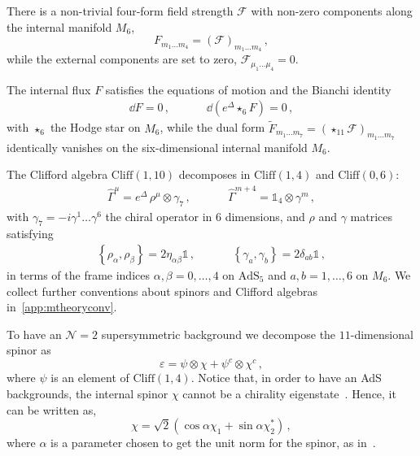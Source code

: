 \documentclass[debug]{phd}
\begin{document}
There is a non-trivial four-form field strength $\mathcal{F}$ with non-zero components along the internal manifold $M_6$, 
%
	\begin{equation}
		F_{m_1 \ldots m_4} = \left(\mathcal{F}\right)_{m_1 \ldots m_4}\, ,
	\end{equation}
%
while the external components are set to zero, $\mathcal{F}_{\mu_1 \ldots \mu_4} = 0$.

The internal flux $F$ satisfies the equations of motion and the Bianchi identity
%
	\begin{equation}
		\begin{array}{ccccc}
			\dd  F = 0\, , & & & & \dd  (e^\Delta \star_6 F) = 0\, , 
		\end{array}
	\end{equation}
%
with $\star_6$ the Hodge star on $M_6$, while the dual form $\tilde{F}_{m_1 \ldots m_7} = \left(\star_{11}\mathcal{F}\right)_{m_1 \ldots m_7}$ identically vanishes on the six-dimensional internal manifold $M_6$.

The Clifford algebra $\mathrm{Cliff}(1,10)$ decomposes in $\mathrm{Cliff}(1,4)$ and $\mathrm{Cliff}(0,6)$:
%
	\begin{equation}
	\label{eq:dec_gammas_m6}
		\begin{array}{ccc}
			\hat{\Gamma}^\mu = e^{\Delta}\,\rho^\mu \otimes \gamma_7\, , & \phantom{and} &\hat{\Gamma}^{m+4} = \mathds{1}_4 \otimes \gamma^m\, ,
		\end{array}
	\end{equation}
%
with $\gamma_7 = - i \gamma^1 \ldots \gamma^6$ the chiral operator in $6$ dimensions, and $\rho$ and $\gamma$ matrices satisfying
%
	\begin{equation}
	\label{eq:cliff}
		\begin{array}{ccc}
			\left\{\rho_\alpha , \rho_\beta \right\} = 2 \eta_{\alpha \beta} \mathds{1}\, , & \phantom{and} &\left\{\gamma_{a} , \gamma_b \right\} = 2 \delta_{ab} \mathds{1}\, ,
		\end{array}
	\end{equation}
%
in terms of the frame indices $\alpha ,\beta = 0,\ldots,4$ on $\mathrm{AdS}_5$ and $a,b = 1, \ldots, 6$ on $M_6$. We collect further conventions about spinors and Clifford algebras in~\cref{app:mtheoryconv}.
%

To have an $\mathcal{N}=2$ supersymmetric background we decompose the $11$-dimensional spinor as
%
	\begin{equation}
	\label{eq:decomp_mtheory_spinors}
		\varepsilon = \psi \otimes \chi + \psi^c \otimes \chi^c\, ,
	\end{equation}
where $\psi$ is an element of $\mathrm{Cliff}(1,4)$. 
Notice that, in order to have an AdS backgrounds, the internal spinor $\chi$ cannot be a chirality eigenstate~\cite{Gauntlett:2004zh}. 
Hence, it can be written as,
%
	\begin{equation}
	\label{chiredef}
		\chi = \sqrt{2} \left(\cos \alpha  \chi_1 + \sin \alpha  \chi_2^* \right)\, ,
	\end{equation}
%
where $\alpha $ is a parameter chosen to get the unit norm for the spinor, as in~\cite{Gauntlett:2004zh}.\\
\end{document}
